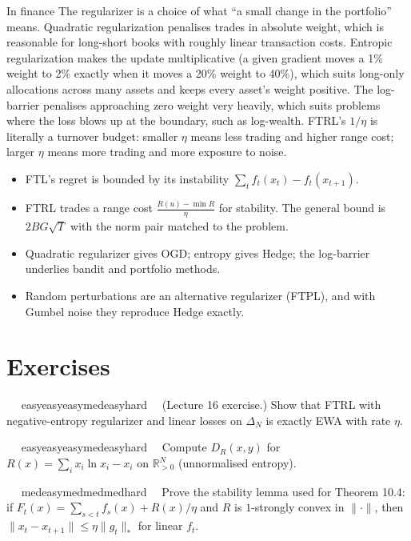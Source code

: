\documentclass[11pt,a4paper,openany]{book}
\newcommand{\R}{\mathbb{R}}
\newcommand{\norm}[1]{\lVert #1\rVert}
\newcommand{\simplex}{\Delta}
\newcommand{\extag}[2]{%
  \def\tmp{#1}\def\tmpE{easy}\def\tmpM{med}\def\tmpH{hard}%
  \ifx\tmp\tmpE\def\tagc{defc}\else\ifx\tmp\tmpM\def\tagc{thmc}\else\ifx\tmp\tmpH\def\tagc{warnc}\else\def\tagc{finc}\fi\fi\fi
  \tcbox[on line,boxrule=0pt,arc=2pt,colback=\tagc!12,left=2pt,right=2pt,top=0pt,bottom=0pt,boxsep=1pt]{\sffamily\scriptsize\bfseries\color{\tagc}#2}}
\newcommand{\exercise}[3]{\par\medskip\noindent\textbf{\sffamily #1}\ \ #2\ \ #3\par}
\begin{document}
\begin{bfin}{In finance}
The regularizer is a choice of what ``a small change in the portfolio'' means. Quadratic regularization penalises trades in absolute weight, which is reasonable for long-short books with roughly linear transaction costs. Entropic regularization makes the update multiplicative (a given gradient moves a 1\% weight to 2\% exactly when it moves a 20\% weight to 40\%), which suits long-only allocations across many assets and keeps every asset's weight positive. The log-barrier penalises approaching zero weight very heavily, which suits problems where the loss blows up at the boundary, such as log-wealth. FTRL's $1/\eta$ is literally a turnover budget: smaller $\eta$ means less trading and higher range cost; larger $\eta$ means more trading and more exposure to noise.
\end{bfin}

\begin{takeaways}
\begin{itemize}
\item FTL's regret is bounded by its instability $\sum_t f_t(x_t)-f_t(x_{t+1})$.
\item FTRL trades a range cost $\frac{R(u)-\min R}{\eta}$ for stability. The general bound is $2BG\sqrt T$ with the norm pair matched to the problem.
\item Quadratic regularizer gives OGD; entropy gives Hedge; the log-barrier underlies bandit and portfolio methods.
\item Random perturbations are an alternative regularizer (FTPL), and with Gumbel noise they reproduce Hedge exactly.
\end{itemize}
\end{takeaways}

\section*{Exercises}\label{ch10-ex}

\exercise{10.1}{\extag{easy}{warm-up}}{\hypertarget{sol-10.1}{}(Lecture 16 exercise.) Show that FTRL with negative-entropy regularizer and linear losses on $\simplex_N$ is exactly EWA with rate $\eta$.}

\exercise{10.2}{\extag{easy}{warm-up}}{\hypertarget{sol-10.2}{}Compute $D_R(x,y)$ for $R(x)=\sum_ix_i\ln x_i-x_i$ on $\R^N_{>0}$ (unnormalised entropy).}

\exercise{10.3}{\extag{med}{core}}{\hypertarget{sol-10.3}{}Prove the stability lemma used for Theorem 10.4: if $F_t(x)=\sum_{s<t}f_s(x)+R(x)/\eta$ and $R$ is $1$-strongly convex in $\norm\cdot$, then $\norm{x_t-x_{t+1}}\le\eta\norm{g_t}_*$ for linear $f_t$.}
\end{document}
